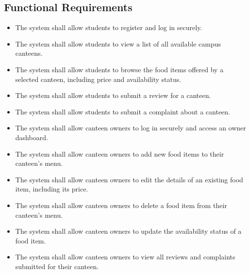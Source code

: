 \documentclass[ 12pt,a4paper,twocolumn,fleqn]{article}
\begin{document}
\subsection{Functional Requirements}
\begin{itemize}
\item The system shall allow students to register and log in securely.
\item The system shall allow students to view a list of all available campus canteens.
\item The system shall allow students to browse the food items offered by a selected canteen, including price and availability status.
\item The system shall allow students to submit a review for a canteen.
\item The system shall allow students to submit a complaint about a canteen.
\item The system shall allow canteen owners to log in securely and access an owner dashboard.
\item The system shall allow canteen owners to add new food items to their canteen's menu.
\item The system shall allow canteen owners to edit the details of an existing food item, including its price.
\item The system shall allow canteen owners to delete a food item from their canteen's menu.
\item The system shall allow canteen owners to update the availability status of a food item.
\item The system shall allow canteen owners to view all reviews and complaints submitted for their canteen.
\end{itemize}
\end{document}
